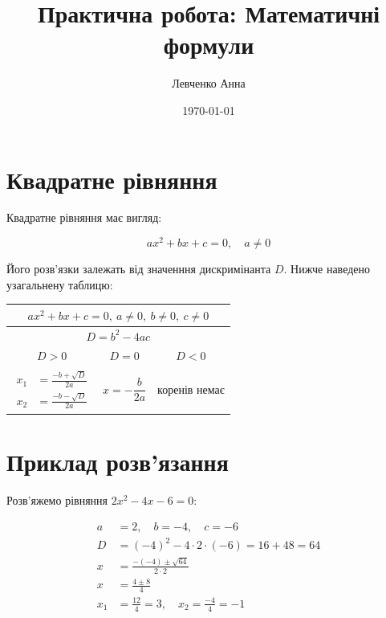 \documentclass[12pt]{article}
\title{Практична робота: Математичні формули}
\author{Левченко Анна}
\date{\today}
\begin{document}
\maketitle

\section*{Квадратне рівняння}

Квадратне рівняння має вигляд:

\begin{equation}
    ax^2 + bx + c = 0, \quad a \neq 0
\end{equation}

Його розв'язки залежать від значенння дискримінанта $D$. Нижче наведено узагальнену таблицю:

\begin{table}[h]
\centering
\renewcommand{\arraystretch}{3}
\begin{tabular}{|c|c|c|}
    \hline
    \multicolumn{3}{|c|}{$ax^2 + bx + c = 0, \ a \neq 0, \ b \neq 0, \ c \neq 0$} \\
    \hline
    \multicolumn{3}{|c|}{$D = b^2 - 4ac$} \\
    \hline
    $D > 0$ & $D = 0$ & $D < 0$ \\
    \hline
    $\begin{aligned}
        x_1 &= \frac{-b + \sqrt{D}}{2a} \\
        x_2 &= \frac{-b - \sqrt{D}}{2a}
    \end{aligned}$ &
    $x = -\dfrac{b}{2a}$ &
    коренів немає \\
    \hline
\end{tabular}
\end{table}

\section*{Приклад розв'язання}
 
Розв'яжемо рівняння $2x^2 - 4x - 6 = 0$:
 
\begin{align*}
    a &= 2, \quad b = -4, \quad c = -6 \\
    D &= (-4)^2 - 4 \cdot 2 \cdot (-6) = 16 + 48 = 64 \\
    x &= \frac{-(-4) \pm \sqrt{64}}{2 \cdot 2} \\
    x &= \frac{4 \pm 8}{4} \\
    x_1 &= \frac{12}{4} = 3, \quad x_2 = \frac{-4}{4} = -1
\end{align*}
\end{document}
